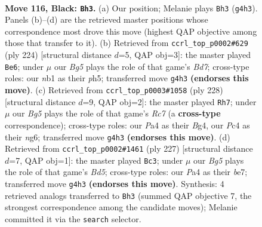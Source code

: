 \documentclass[11pt]{article}
\begin{document}
\clearpage

\begin{figure}[p]\centering
\begin{subfigure}{0.46\textwidth}\centering
\resizebox{\linewidth}{!}{%
\newchessgame
\chessboard[
  setfen={8/B7/5k2/8/p1p3b1/8/5K2/1N6 b - - 87 116},
  showmover=false,
  pgfstyle=straightmove, color=movearrow, markmove={g4-h3}
]}
\caption{}
\end{subfigure}\hfill
\begin{subfigure}{0.46\textwidth}\centering
\resizebox{\linewidth}{!}{%
\newchessgame
\chessboard[
  setfen={1b6/1P1B4/8/7p/5k1P/8/8/5K2 w - - 13 113},
  showmover=false,
  pgfstyle=straightmove, color=movearrow, markmove={d7-e6}
]}
\caption{}
\end{subfigure}
\\[4pt]
\begin{subfigure}{0.46\textwidth}\centering
\resizebox{\linewidth}{!}{%
\newchessgame
\chessboard[
  setfen={8/2R5/5bn1/3K4/6B1/8/1k6/8 w - - 69 115},
  showmover=false,
  pgfstyle=straightmove, color=movearrow, markmove={c7-h7}
]}
\caption{}
\end{subfigure}\hfill
\begin{subfigure}{0.46\textwidth}\centering
\resizebox{\linewidth}{!}{%
\newchessgame
\chessboard[
  setfen={6k1/4B3/6K1/8/2pbB3/8/8/8 b - - 3 114},
  showmover=false,
  pgfstyle=straightmove, color=movearrow, markmove={d4-c3}
]}
\caption{}
\end{subfigure}
\caption{\textbf{Move 116, Black: \texttt{Bh3}.} (a) Our position; Melanie plays \texttt{Bh3} (\texttt{g4h3}). Panels (b)--(d) are the retrieved master positions whose correspondence most drove this move (highest QAP objective among those that transfer to it). (b) Retrieved from \texttt{ccrl\_top\_p0002\#629} (ply 224) [structural distance $d$=5, QAP obj=3]: the master played \texttt{Be6}; under $\mu$ our \emph{Bg5} plays the role of that game's \emph{Bd7}; cross-type roles: our \emph{n}b1 as their \emph{p}h5; transferred move \texttt{g4h3} \textbf{(endorses this move)}. (c) Retrieved from \texttt{ccrl\_top\_p0003\#1058} (ply 228) [structural distance $d$=9, QAP obj=2]: the master played \texttt{Rh7}; under $\mu$ our \emph{Bg5} plays the role of that game's \emph{Rc7} (a \textbf{cross-type} correspondence); cross-type roles: our \emph{P}a4 as their \emph{B}g4, our \emph{P}c4 as their \emph{n}g6; transferred move \texttt{g4h3} \textbf{(endorses this move)}. (d) Retrieved from \texttt{ccrl\_top\_p0002\#1461} (ply 227) [structural distance $d$=7, QAP obj=1]: the master played \texttt{Bc3}; under $\mu$ our \emph{Bg5} plays the role of that game's \emph{Bd5}; cross-type roles: our \emph{P}a4 as their \emph{b}e7; transferred move \texttt{g4h3} \textbf{(endorses this move)}. Synthesis: 4 retrieved analogs transferred to \texttt{Bh3} (summed QAP objective 7, the strongest correspondence among the candidate moves); Melanie committed it via the \texttt{search} selector.}
\label{fig:thought-m231}
\end{figure}
\end{document}
